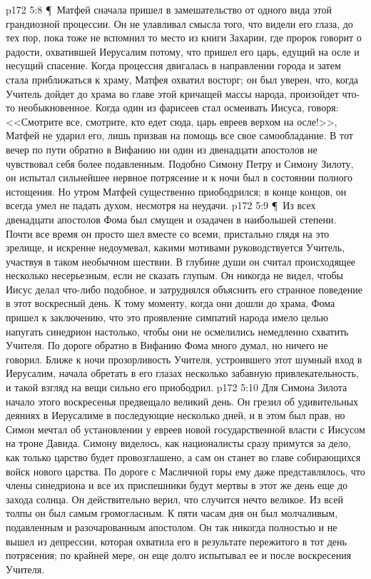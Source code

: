 \vs p172 5:8 \P\ Матфей сначала пришел в замешательство от одного вида этой грандиозной процессии. Он не улавливал смысла того, что видели его глаза, до тех пор, пока тоже не вспомнил то место из книги Захарии, где пророк говорит о радости, охватившей Иерусалим потому, что пришел его царь, едущий на осле и несущий спасение. Когда процессия двигалась в направлении города и затем стала приближаться к храму, Матфея охватил восторг; он был уверен, что, когда Учитель дойдет до храма во главе этой кричащей массы народа, произойдет что\hyp{}то необыкновенное. Когда один из фарисеев стал осмеивать Иисуса, говоря: <<Смотрите все, смотрите, кто едет сюда, царь евреев верхом на осле!>>, Матфей не ударил его, лишь призвав на помощь все свое самообладание. В тот вечер по пути обратно в Вифанию ни один из двенадцати апостолов не чувствовал себя более подавленным. Подобно Симону Петру и Симону Зилоту, он испытал сильнейшее нервное потрясение и к ночи был в состоянии полного истощения. Но утром Матфей существенно приободрился; в конце концов, он всегда умел не падать духом, несмотря на неудачи.
\vs p172 5:9 \P\ Из всех двенадцати апостолов Фома был смущен и озадачен в наибольшей степени. Почти все время он просто шел вместе со всеми, пристально глядя на это зрелище, и искренне недоумевал, какими мотивами руководствуется Учитель, участвуя в таком необычном шествии. В глубине души он считал происходящее несколько несерьезным, если не сказать глупым. Он никогда не видел, чтобы Иисус делал что\hyp{}либо подобное, и затруднялся объяснить его странное поведение в этот воскресный день. К тому моменту, когда они дошли до храма, Фома пришел к заключению, что это проявление симпатий народа имело целью напугать синедрион настолько, чтобы они не осмелились немедленно схватить Учителя. По дороге обратно в Вифанию Фома много думал, но ничего не говорил. Ближе к ночи прозорливость Учителя, устроившего этот шумный вход в Иерусалим, начала обретать в его глазах несколько забавную привлекательность, и такой взгляд на вещи сильно его приободрил.
\vs p172 5:10 Для Симона Зилота начало этого воскресенья предвещало великий день. Он грезил об удивительных деяниях в Иерусалиме в последующие несколько дней, и в этом был прав, но Симон мечтал об установлении у евреев новой государственной власти с Иисусом на троне Давида. Симону виделось, как националисты сразу примутся за дело, как только царство будет провозглашено, а сам он станет во главе собирающихся войск нового царства. По дороге с Масличной горы ему даже представлялось, что члены синедриона и все их приспешники будут мертвы в этот же день еще до захода солнца. Он действительно верил, что случится нечто великое. Из всей толпы он был самым громогласным. К пяти часам дня он был молчаливым, подавленным и разочарованным апостолом. Он так никогда полностью и не вышел из депрессии, которая охватила его в результате пережитого в тот день потрясения; по крайней мере, он еще долго испытывал ее и после воскресения Учителя.
